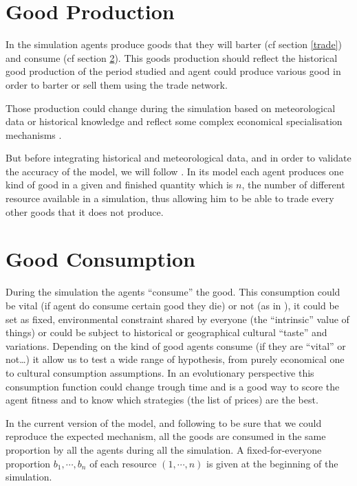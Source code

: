 \documentclass[a4paper]{article}
\begin{document}
\section{Good Production}
\label{production}


In the simulation agents produce goods that they will barter (cf section \ref{trade}) and consume (cf section \ref{consumption}). This goods production should reflect the historical good production of the period studied and agent could produce various good in order to barter or sell them using the trade network.

Those production could change during the simulation based on meteorological data or historical knowledge and reflect some complex economical specialisation mechanisms \cite{bentley_specialisation_2005}.

But before integrating historical and meteorological data, and in order to validate the accuracy of the model, we will follow \cite{gintis_emergence_2006}. In its model each agent produces one kind of good in a given and finished quantity which is $n$, the number of different resource available in a simulation, thus allowing him to be able to trade every other goods that it does not produce.

\section{Good Consumption}
\label{consumption}



During the simulation the agents ``consume'' the good. This consumption could be vital (if agent do consume certain good they die) or not (as in \cite{macmillan_agent-based_2008}), it could be set as fixed, environmental constraint shared by everyone (the ``intrinsic'' value of things) or could be subject to historical or geographical cultural ``taste'' and variations. Depending on the kind of good agents consume (if they are ``vital'' or not\ldots) it allow us to test a wide range of hypothesis, from purely economical one to cultural consumption assumptions.  In an evolutionary perspective this consumption function could change trough time and is a good way to score the agent fitness and to know which strategies (the list of prices) are the best.

In the current version of the model, and following
\cite{gintis_emergence_2006} to be sure that we could reproduce the expected mechanism, all the goods are consumed in the same proportion by all the agents during all the simulation. A fixed-for-everyone proportion $b_1,\cdots,b_n$ of each resource $(1, \cdots, n)$ is given at the beginning of the simulation.
\end{document}
